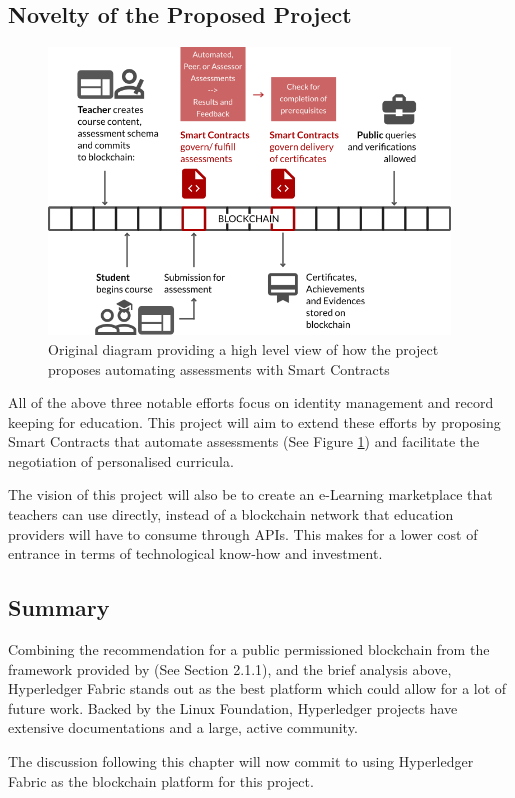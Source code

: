 \subsection{Novelty of the Proposed Project}

\begin{figure}[!ht]
	\centering
	\includegraphics[width=0.95\textwidth]{moocon}
	\caption[Assessment Smart Contracts Concept]
	{Original diagram providing a high level view of how the project proposes automating assessments
		with Smart Contracts}
	\label{fig:moocon_assess}
\end{figure}

All of the above three notable efforts focus on identity management and record keeping for education.
This project will aim to extend these efforts by proposing Smart Contracts that automate assessments
(See Figure \ref{fig:moocon_assess}) and facilitate the negotiation of personalised curricula.

The vision of this project will also be to create an e-Learning marketplace that teachers can use directly,
instead of a blockchain network that education providers will have to consume through APIs. This makes for a
lower cost of entrance in terms of technological know-how and investment.

\subsection*{Summary}

Combining the recommendation for a public permissioned blockchain from the framework provided
by \citet{wust2017you} (See Section 2.1.1), and the brief analysis above, Hyperledger Fabric
stands out as the best platform which could allow for a lot of future work. Backed by the
Linux Foundation, Hyperledger projects have extensive documentations and a large,
active community.

The discussion following this chapter will now commit to using Hyperledger
Fabric as the blockchain platform for this project.

